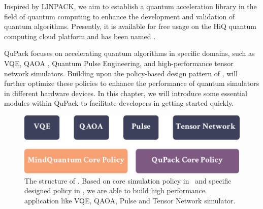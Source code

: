 



Inspired by LINPACK, we aim to establish a quantum acceleration library in the field of quantum computing to enhance the development and validation of quantum algorithms. Presently, it is available for free usage on the HiQ quantum computing cloud platform and has been named \QuPack.

QuPack focuses on accelerating quantum algorithms in specific domains, such as VQE, QAOA , Quantum Pulse Engineering, and high-performance tensor network simulators. Building upon the policy-based design pattern of \MindQuantum, \QuPack will further optimize these policies to enhance the performance of quantum simulators in different hardware devices. In this chapter, we will introduce some essential modules within QuPack to facilitate developers in getting started quickly.

\begin{figure}[ht]
    \centering
    \includegraphics[scale=0.5]{./images/6_qupack_layer.pdf}
    \captionsetup{justification=raggedright,singlelinecheck=false}
    \caption{\label{6_qupack_layer} The structure of \QuPack. Based on core simulation policy in \MindQuantum\ and specific designed policy in \QuPack, we are able to build high performance application like VQE, QAOA, Pulse and Tensor Network simulator.}
\end{figure}
